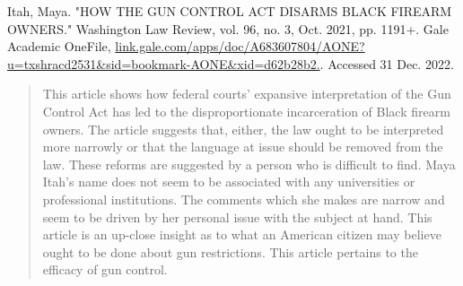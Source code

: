 \documentclass [12pt]{article}
\newcommand{\bibent}{\noindent \hangindent 40pt}
\newcommand{\bibannote}{\begin{quotation}}
\newcommand{\bibendote}{\end{quotation}}
\begin{document}
\bibent Itah, Maya. "HOW THE GUN CONTROL ACT DISARMS BLACK FIREARM OWNERS." Washington Law Review, vol. 96, no. 3, Oct. 2021, pp. 1191+. Gale Academic OneFile, \url{link.gale.com/apps/doc/A683607804/AONE?u=txshracd2531&sid=bookmark-AONE&xid=d62b28b2.}. Accessed 31 Dec. 2022.
\bibannote
This article shows how federal courts' expansive interpretation of the Gun Control Act has led to the disproportionate incarceration of Black firearm owners. The article suggests that, either, the law ought to be interpreted more narrowly or that the language at issue should be removed from the law. These reforms are suggested by a person who is difficult to find. Maya Itah's name does not seem to be associated with any universities or professional institutions. The comments which she makes are narrow and seem to be driven by her personal issue with the subject at hand. This article is an up-close insight as to what an American citizen may believe ought to be done about gun restrictions. This article pertains to the efficacy of gun control.
\bibendote
\end{document}
